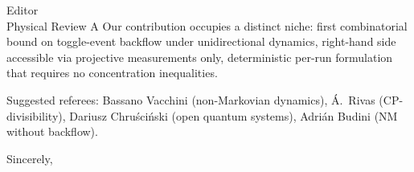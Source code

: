 \documentclass[12pt]{letter}
\begin{document}
\begin{letter}{Editor\\Physical Review A}
Our contribution occupies a distinct niche: first combinatorial bound on toggle-event backflow under unidirectional dynamics, right-hand side accessible via projective measurements only, deterministic per-run formulation that requires no concentration inequalities.

Suggested referees: Bassano Vacchini (non-Markovian dynamics), \'A.\ Rivas (CP-divisibility), Dariusz Chru\'sci\'nski (open quantum systems), Adri\'an Budini (NM without backflow).

\closing{Sincerely,}

\end{letter}
\end{document}

